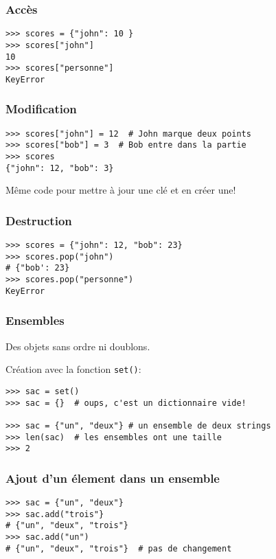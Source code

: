 \documentclass{beamer}
\begin{document}
\begin{frame}[fragile]
  \frametitle{Accès}
\begin{lstlisting}
>>> scores = {"john": 10 }
>>> scores["john"]
10
>>> scores["personne"]
KeyError
\end{lstlisting}
\end{frame}

\begin{frame}[fragile]
  \frametitle{Modification}

\begin{lstlisting}
>>> scores["john"] = 12  # John marque deux points
>>> scores["bob"] = 3  # Bob entre dans la partie
>>> scores
{"john": 12, "bob": 3}
\end{lstlisting}

\vfill

Même code pour mettre à jour une clé et en créer une!
\end{frame}

\begin{frame}[fragile]
  \frametitle{Destruction}

\begin{lstlisting}
>>> scores = {"john": 12, "bob": 23}
>>> scores.pop("john")
# {"bob': 23}
>>> scores.pop("personne")
KeyError
\end{lstlisting}

\end{frame}

\begin{frame}[fragile]
  \frametitle{Ensembles}
Des objets sans ordre ni doublons.

Création avec la fonction \texttt{set()}:

\begin{lstlisting}
>>> sac = set()
>>> sac = {}  # oups, c'est un dictionnaire vide!

>>> sac = {"un", "deux"} # un ensemble de deux strings
>>> len(sac)  # les ensembles ont une taille
>>> 2
\end{lstlisting}
\end{frame}

\begin{frame}[fragile]
  \frametitle{Ajout d'un élement dans un ensemble}
\begin{lstlisting}
>>> sac = {"un", "deux"}
>>> sac.add("trois"}
# {"un", "deux", "trois"}
>>> sac.add("un")
# {"un", "deux", "trois"}  # pas de changement
\end{lstlisting}
\end{frame}
\end{document}
